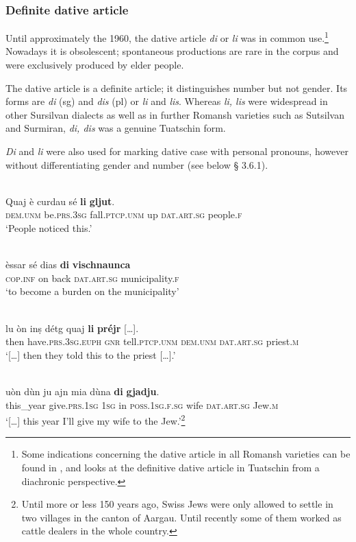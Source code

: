 \subsubsection{Definite dative article} 
Until approximately the 1960, the dative article \textit{di} or \textit{li} was in common use.\footnote{Some indications concerning the dative article in all Romansh varieties can be found in \citet{Linder1987}, and \citet{Maurer2017} looks at the definitive dative article in Tuatschin from a diachronic perspective.} Nowadays it is obsolescent; spontaneous productions are rare in the corpus and were exclusively produced by elder people.

The dative article is a definite article; it distinguishes number but not gender. Its forms are \textit{di} (sg) and \textit{dis} (pl) or \textit{li} and \textit{lis}.  Whereas \textit{li, lis} were widespread in other Sursilvan dialects as well as in further  Romansh varieties such as Sutsilvan and Surmiran, \textit{di, dis} was a genuine Tuatschin form.

\textit{Di} and \textit{li} were also used for marking dative case with personal pronouns, however without differentiating gender and number (see below § 3.6.1).

\ea\label{}
 {\citealt[12]{Büchli1966}}\\
\gll  Quaj è curdau sé \textbf{li} \textbf{gljut}.\\
     \textsc{dem.unm} be.\textsc{prs.3sg} fall.\textsc{ptcp.unm} up \textsc{dat.art.sg} people.\textsc{f}\\
\glt `People noticed this.'
\z

\ea\label{ex:1:}
\\
\gll  èssar sé dias \textbf{di} \textbf{vischnaunca}\\
\textsc{cop.inf} on back \textsc{dat.art.sg} municipality.\textsc{f}\\
\glt `to become a burden on the municipality'
\z

\ea\label{}
\\
\gll […] lu òn inṣ détg quaj \textbf{li} \textbf{préjr} […].\\
{} then have.\textsc{prs.3sg.euph} \textsc{gnr} tell.\textsc{ptcp.unm} \textsc{dem.unm} \textsc{dat.art.sg} priest.\textsc{m}\\
\glt `[…] then they told this to the priest […].'
\z

\ea\label{}
\\
\gll […] uòn dùn ju ajn mia dùna \textbf{di} \textbf{gjadju}.\\
{} this\_year give.\textsc{prs.1sg} \textsc{1sg} in \textsc{poss.1sg.f.sg} wife \textsc{dat.art.sg} Jew.\textsc{m} \\
\glt `[…] this year I’ll give my wife to the Jew.'\footnote{Until more or less 150 years ago, Swiss Jews were only allowed to settle in two villages in the canton of Aargau. Until recently some of them worked as cattle dealers in the whole country.}
\z


